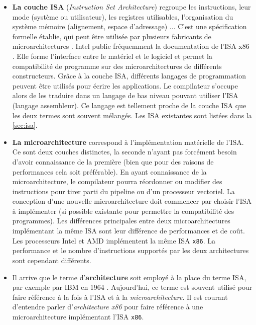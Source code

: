 \begin{itemize}
    \item  \textbf{La couche ISA} (\textit{Instruction Set Architecture}) regroupe les instructions, leur mode (système ou utilisateur), les registres utilisables, l'organisation du système mémoire (alignement, espace d'adressage) ... 
    C'est une spécification formelle établie, qui peut être utilisée par plusieurs fabricants de microarchitectures \cite{tanenbaum2016structured}. Intel publie fréquemment la documentation de l'ISA x86 \cite{Intel2018}. Elle forme l'interface entre le matériel et le logiciel et permet la compatibilité de programme sur des microarchitectures de différents constructeurs. 
    Grâce à la couche ISA, différents langages de programmation peuvent être utilisés pour écrire les applications. Le compilateur s'occupe alors de les traduire dans un langage de bas niveau pouvant utiliser l'ISA (langage assembleur). Ce langage est tellement proche de la couche ISA que les deux termes sont souvent mélangés. Les ISA existantes sont listées dans la \autoref{sec:isa}. 

    \item \textbf{La microarchitecture} correspond à l'implémentation matérielle de l'ISA. Ce sont deux couches distinctes, la seconde n'ayant pas forcément besoin d'avoir connaissance de la première (bien que pour des raisons de performances cela soit préférable). En ayant connaissance de la microarchitecture, le compilateur pourra réordonner ou modifier des instructions pour tirer parti du pipeline ou d'un processeur vectoriel. La conception d'une nouvelle microarchitecture doit commencer par choisir l'ISA à implémenter (si possible existante pour permettre la compatibilité des programmes). Les différences principales entre deux microarchitectures implémentant la même ISA sont leur différence de performances et de coût. Les processeurs Intel et AMD implémentent la même ISA \verb|x86|. La performance et le nombre d'instructions supportés par les deux architectures sont cependant différents.
    
    \item Il arrive que le terme d'\textbf{architecture} soit employé à la place du terme ISA, par exemple par IBM en 1964 \cite{amdahl1964architecture}.  Aujourd'hui, ce terme est souvent utilisé pour faire référence à la fois à l'ISA et à la \textit{microarchitecture}. Il est courant d'entendre parler d'\textit{architecture x86} pour faire référence à une microarchitecture implémentant l'ISA \verb|x86|.\\ 
\end{itemize}

